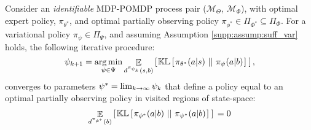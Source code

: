 \setcounter{sthe}{\value{theorem}}
\setcounter{theorem}{1}                   %
\begin{theorem}\label{supp:def:fixed_point_variational}
Consider an \emph{identifiable} MDP-POMDP process pair ($\mathcal{M}_{\Theta}$, $\mathcal{M}_{\Phi}$), with optimal expert policy, $\pi_{\theta^*}$, and optimal partially observing policy $\pi_{\phi^*} \in \Pi_{\Phi^*} \subseteq \Pi_{\Phi}$.  For a variational policy $\pi_{\psi} \in \Pi_{\Psi}$, and assuming Assumption \ref{supp:assump:suff_var} holds, the following iterative procedure:
\begin{equation}
    \psi_{k+1} = \mathop{\operatorname{arg\,min}}_{\psi \in \Psi}  \mathop{\mathbb{E}}_{d^{\pi_{\psi_k}}(s,b)}  \left[ \hspace*{0.1em}{}  \mathbb{KL} \left[ \hspace*{0.1em}{}  \pi_{\theta^*}(a|s) \ ||\ {} \pi_\psi(a|b) \hspace*{0.1em} \right]{}  \hspace*{0.1em} \right]{} , \label{supp:equ:t1:1}
\end{equation}
converges to parameters $\psi^* = \lim_{k\rightarrow\infty} \psi_{k}$ that define a policy equal to an optimal partially observing policy in visited regions of state-space: 
\begin{equation}
    \mathop{\mathbb{E}}_{d^{\pi_{\phi^*}}(b)}  \left[ \hspace*{0.1em}{}  \mathbb{KL} \left[ \hspace*{0.1em}{}  \pi_{\phi^*}(a|b) \ ||\ {} \pi_{\psi^*}(a|b) \hspace*{0.1em} \right]{}  \hspace*{0.1em} \right]{}  = 0 \label{supp:equ:please_make_it_stop}
\end{equation}
\end{theorem}
\setcounter{theorem}{\value{sthe}}
